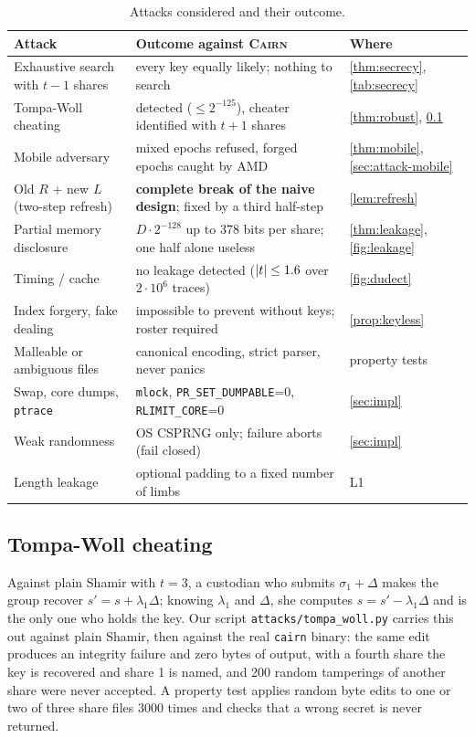\documentclass[10.5pt,a4paper]{article}
\theoremstyle{plain}
\theoremstyle{definition}
\newcommand{\cairn}{\textsc{Cairn}}
\newcommand{\code}[1]{\texttt{#1}}
\begin{document}
\begin{table}[t]
\centering\small
\begin{tabularx}{\textwidth}{@{}>{\raggedright}p{3.6cm} X >{\raggedright\arraybackslash}p{3.3cm}@{}}
\toprule
Attack & Outcome against \cairn{} & Where\\
\midrule
Exhaustive search with $t-1$ shares & every key equally likely; nothing to search & \cref{thm:secrecy}, \cref{tab:secrecy}\\
Tompa-Woll cheating~\cite{tompa88} & detected ($\le2^{-125}$), cheater identified with $t+1$ shares & \cref{thm:robust}, \cref{sec:attack-tw}\\
Mobile adversary~\cite{ostrovsky91} & mixed epochs refused, forged epochs caught by AMD & \cref{thm:mobile}, \cref{sec:attack-mobile}\\
Old $R$ + new $L$ (two-step refresh) & \textbf{complete break of the naive design}; fixed by a third half-step & \cref{lem:refresh}\\
Partial memory disclosure & $D\cdot2^{-128}$ up to 378 bits per share; one half alone useless & \cref{thm:leakage}, \cref{fig:leakage}\\
Timing / cache & no leakage detected ($|t|\le1.6$ over $2\cdot10^6$ traces) & \cref{fig:dudect}\\
Index forgery, fake dealing & impossible to prevent without keys; roster required & \cref{prop:keyless}\\
Malleable or ambiguous files & canonical encoding, strict parser, never panics & property tests\\
Swap, core dumps, \code{ptrace} & \code{mlock}, \code{PR\_SET\_DUMPABLE}=0, \code{RLIMIT\_CORE}=0 & \cref{sec:impl}\\
Weak randomness & OS CSPRNG only; failure aborts (fail closed) & \cref{sec:impl}\\
Length leakage & optional padding to a fixed number of limbs & L1\\
\bottomrule
\end{tabularx}
\caption{Attacks considered and their outcome.}\label{tab:attacks}
\end{table}

\subsection{Tompa-Woll cheating}\label{sec:attack-tw}
Against plain Shamir with $t=3$, a custodian who submits $\sigma_1+\Delta$ makes the group recover $s'=s+\lambda_1\Delta$; knowing $\lambda_1$ and $\Delta$, she computes $s=s'-\lambda_1\Delta$ and is the only one who holds the key. Our script \code{attacks/tompa\_woll.py} carries this out against plain Shamir, then against the real \code{cairn} binary: the same edit produces an integrity failure and zero bytes of output, with a fourth share the key is recovered and share 1 is named, and 200 random tamperings of another share were never accepted. A property test applies random byte edits to one or two of three share files 3000 times and checks that a wrong secret is never returned.
\end{document}
